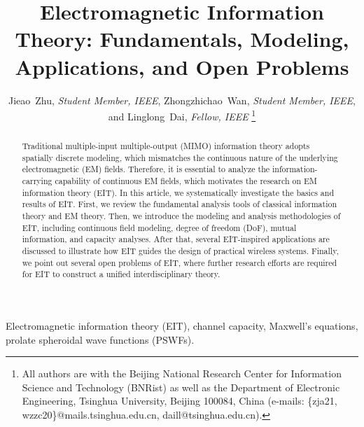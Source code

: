 \documentclass[journal,twocolumn]{IEEEtran}
\begin{document}
\title{Electromagnetic Information Theory: Fundamentals, Modeling, Applications, and Open Problems}

\author{{Jieao~Zhu, {\textit{Student Member, IEEE}}, Zhongzhichao~Wan, {\textit{Student Member, IEEE}}, and Linglong~Dai, {\textit{Fellow, IEEE}}}
\thanks{All authors are with the Beijing National Research Center for Information Science and Technology (BNRist) as well as the Department of Electronic Engineering, Tsinghua University, Beijing 100084, China (e-mails: \{zja21, wzzc20\}@mails.tsinghua.edu.cn, daill@tsinghua.edu.cn).
}
}

\maketitle

\begin{abstract}
	Traditional multiple-input multiple-output (MIMO) information theory adopts spatially discrete modeling, which mismatches the continuous nature of the underlying electromagnetic (EM) fields. %
 	Therefore, it is essential to analyze the information-carrying capability of continuous EM fields, which motivates the research on EM information theory (EIT). In this article, we systematically investigate the basics and results of EIT. First, we review the fundamental analysis tools of classical information theory and EM theory. Then, we introduce the modeling and analysis methodologies of EIT, including continuous field modeling, degree of freedom (DoF), mutual information, and capacity analyses. After that, several EIT-inspired applications are discussed to illustrate how EIT guides the design of practical wireless systems.  Finally, we point out several open problems of EIT, where further research efforts are required for EIT to construct a unified interdisciplinary theory.
\end{abstract}

\begin{IEEEkeywords}
    Electromagnetic information theory (EIT), channel capacity, Maxwell's equations, prolate spheroidal wave functions (PSWFs). 
\end{IEEEkeywords}
\end{document}
